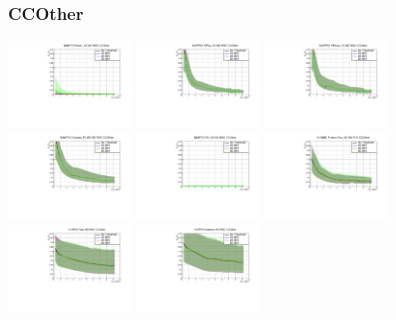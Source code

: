 \subsubsection{CCOther}

\begin{center}

  \includegraphics[width=0.245\textwidth]{plots/Elost_profiles/Proton_KE_RHC_CCOther.pdf}
  \includegraphics[width=0.245\textwidth]{plots/Elost_profiles/PiPlus_KE_RHC_CCOther.pdf}
  \includegraphics[width=0.245\textwidth]{plots/Elost_profiles/PiMinus_KE_RHC_CCOther.pdf}
  \includegraphics[width=0.245\textwidth]{plots/Elost_profiles/Charged_Pi_KE_RHC_CCOther.pdf}
  \includegraphics[width=0.245\textwidth]{plots/Elost_profiles/Pi0_KE_RHC_CCOther.pdf}
  \includegraphics[width=0.245\textwidth]{plots/Elost_profiles/Proton+Pion_KE_RHC_CCOther.pdf}
  \includegraphics[width=0.245\textwidth]{plots/Elost_profiles/Total_RHC_CCOther.pdf}
  \includegraphics[width=0.245\textwidth]{plots/Elost_profiles/Hadrons_RHC_CCOther.pdf}
  
\end{center}
